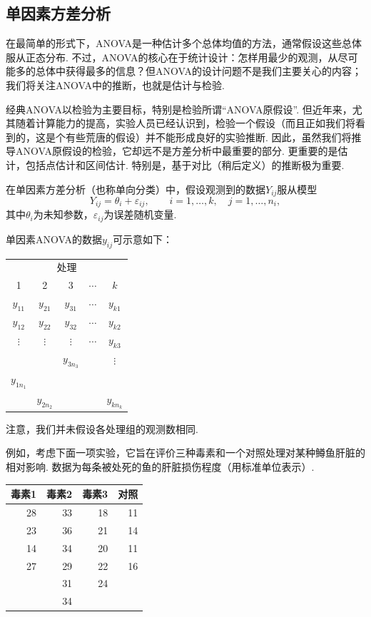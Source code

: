 \subsection{单因素方差分析}\label{sec:11.2}
在最简单的形式下，ANOVA是一种估计多个总体均值的方法，通常假设这些总体服从正态分布. 不过，ANOVA的核心在于统计设计：怎样用最少的观测，从尽可能多的总体中获得最多的信息？但ANOVA的设计问题不是我们主要关心的内容；我们将关注ANOVA中的推断，也就是估计与检验.

经典ANOVA以检验为主要目标，特别是检验所谓“ANOVA原假设”. 但近年来，尤其随着计算能力的提高，实验人员已经认识到，检验一个假设（而且正如我们将看到的，这是个有些荒唐的假设）并不能形成良好的实验推断. 因此，虽然我们将推导ANOVA原假设的检验，它却远不是方差分析中最重要的部分. 更重要的是估计，包括点估计和区间估计. 特别是，基于对比（稍后定义）的推断极为重要.

在单因素方差分析（也称单向分类）中，假设观测到的数据$Y_{ij}$服从模型
\begin{equation}\label{eq:11.2.1}
Y_{ij}=\theta_i+\varepsilon_{ij},\qquad i=1,\ldots,k,\quad j=1,\ldots,n_i,
\end{equation}
其中$\theta_i$为未知参数，$\varepsilon_{ij}$为误差随机变量.

\begin{example}[单因素ANOVA]\label{ex:11.2.1}
单因素ANOVA的数据$y_{ij}$可示意如下：
\begin{center}
\begin{tabular}{ccccc}
\toprule
\multicolumn{5}{c}{处理}\\
1&2&3&$\cdots$&$k$\\\midrule
$y_{11}$&$y_{21}$&$y_{31}$&$\cdots$&$y_{k1}$\\
$y_{12}$&$y_{22}$&$y_{32}$&$\cdots$&$y_{k2}$\\
$\vdots$&$\vdots$&$\vdots$&$\cdots$&$y_{k3}$\\
&&$y_{3n_3}$&&$\vdots$\\
$y_{1n_1}$&&&&\\
&$y_{2n_2}$&&&$y_{kn_k}$\\\bottomrule
\end{tabular}
\end{center}
注意，我们并未假设各处理组的观测数相同.

例如，考虑下面一项实验，它旨在评价三种毒素和一个对照处理对某种鳟鱼肝脏的相对影响. 数据为每条被处死的鱼的肝脏损伤程度（用标准单位表示）.
\begin{center}
\begin{tabular}{rrrr}
\toprule
毒素1&毒素2&毒素3&对照\\\midrule
28&33&18&11\\
23&36&21&14\\
14&34&20&11\\
27&29&22&16\\
&31&24&\\
&34&&\\\bottomrule
\end{tabular}
\end{center}
\end{example}

